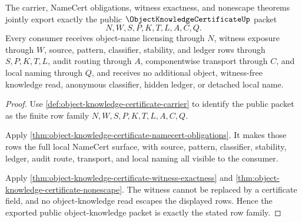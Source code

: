 \begin{theorem}
\label{thm:object-knowledge-certificate-public-export}
The carrier, NameCert obligations, witness exactness, and nonescape theorems jointly export exactly the public $\ObjectKnowledgeCertificateUp$ packet
$$
N,W,S,P,K,T,L,A,C,Q.
$$
Every consumer receives object-name licensing through $N$, witness exposure through $W$, source, pattern, classifier, stability, and ledger rows through $S,P,K,T,L$, audit routing through $A$, componentwise transport through $C$, and local naming through $Q$, and receives no additional object, witness-free knowledge read, anonymous classifier, hidden ledger, or detached local name.
\end{theorem}
\begin{proof}
Use \autoref{def:object-knowledge-certificate-carrier} to identify the public packet as the finite row family $N,W,S,P,K,T,L,A,C,Q$.

Apply \autoref{thm:object-knowledge-certificate-namecert-obligations}. It makes those rows the full local NameCert surface, with source, pattern, classifier, stability, ledger, audit route, transport, and local naming all visible to the consumer.

Apply \autoref{thm:object-knowledge-certificate-witness-exactness} and \autoref{thm:object-knowledge-certificate-nonescape}. The witness cannot be replaced by a certificate field, and no object-knowledge read escapes the displayed rows. Hence the exported public object-knowledge packet is exactly the stated row family.
\end{proof}

